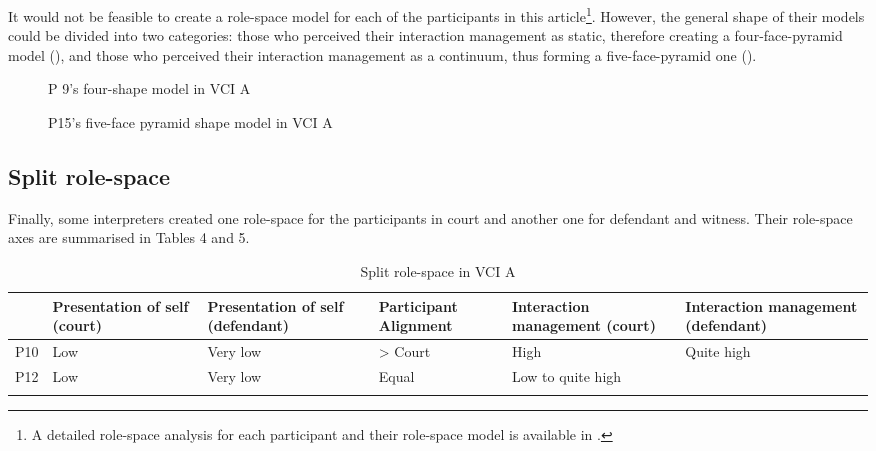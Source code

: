 \documentclass[output=paper]{langsci/langscibook}
\begin{document}
It would not be feasible to create a role-space model for each of the participants in this article\footnote{A detailed role-space analysis for each participant and their role-space model is available in \citet{Devaux2017b}.}. However, the general shape of their models could be divided into two categories: those who perceived their interaction management as static, therefore creating a four-face-pyramid model (), and those who perceived their interaction management as a continuum, thus forming a five-face-pyramid one ().  

  

 

\begin{figure}
\caption{P 9's four-shape model in \textsc{VCI} A}\label{fig:devaux:3}
\end{figure}

\begin{figure}
\caption{P15's five-face pyramid shape model in \textsc{VCI} A\label{fig:devaux:4}}
\end{figure}

\subsection{Split role-space}
Finally, some interpreters created one role-space for the participants in court and another one for defendant and witness. Their role-space axes are summarised in Tables 4 and 5. 

\begin{table}
\begin{tabularx}{\textwidth}{XXXXXX}
	\lsptoprule
& {Presentation of self (court)} & {Presentation of self (defendant)} & {Participant Alignment} & {Interaction management (court)} & {Interaction management (defendant)}\\\midrule
P10 & Low & Very low & > Court & High & Quite high\\
P12 & Low & Very low & Equal & \multicolumn{2}{X}{Low to quite high}\\
\lspbottomrule
\end{tabularx}
\caption{Split role-space in \textsc{VCI} A\label{tab:devaux:4}}
\end{table}
\end{document}
